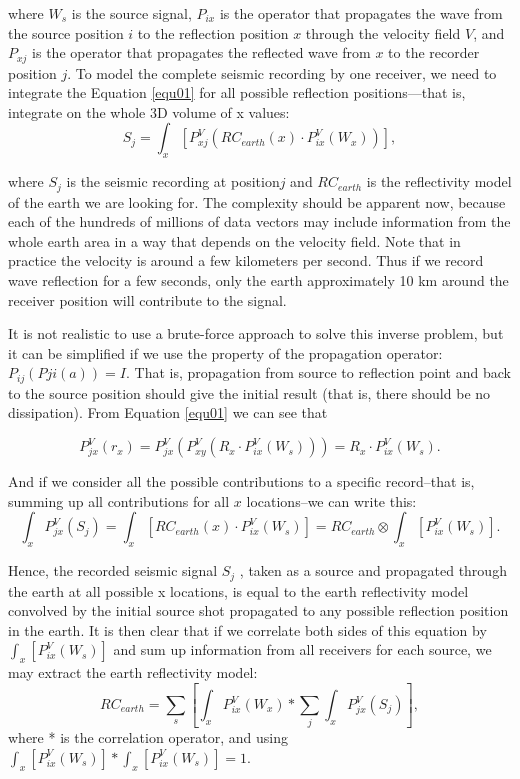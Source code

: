 \documentclass[twocolumn]{article}
\begin{document}
where $W_s$ is the source signal, $P_{ix}$ is the operator that propagates the wave from the source position $i$ to the reflection position $x$ through the velocity field $V$, and $P_{xj}$ is the operator that propagates the reflected wave from $x$ to the recorder position $j$.
To model the complete seismic recording by one receiver, we need to integrate the Equation \ref{equ01} for all possible reflection positions—that is, integrate on the whole 3D volume of x values:
\begin{equation}
S_j = \int_x [P^V_{xj}(RC_{earth}(x) \cdot P^V_{ix}(W_x))],
\label{equ02}
\end{equation}

where $S_j$ is the seismic recording at position$j$ and $RC_{earth}$ is the reflectivity model of the earth we are looking for. The complexity should be apparent now, because each of the hundreds of millions of data vectors may include information from the whole earth area in a way that depends on the velocity field. Note that in practice the velocity is around a few kilometers per second. Thus if we record wave reflection for a few seconds, only the earth approximately 10 km around the receiver position will contribute to the signal.

It is not realistic to use a brute-force approach to solve this inverse problem, but it can be simplified if we use the property of the propagation operator: $P_{ij} (Pji (a)) = I$. That is, propagation from source to reflection point and back to the source position should give the initial result (that is, there should be no dissipation). From Equation \ref{equ01} we can see that

\begin{equation}
P^V_{jx}(r_x) = P^V_{jx}(P^V_{xy}(R_x \cdot P^V_{ix} (W_s))) = R_x \cdot P^V_{ix}(W_s).
\label{equ03}
\end{equation}

And if we consider all the possible contributions to a specific record--that is, summing up all contributions for all $x$ locations--we can write this:
\begin{equation}
\int_x P^V_{jx}(S_j) = \int_x[RC_{earth}(x) \cdot P^V_{ix}(W_s)]  = RC_{earth} \otimes \int_x[P^V_{ix}(W_s)].
\label{equ04}
\end{equation}

Hence, the recorded seismic signal $S_j$ , taken as a source and propagated through the earth at all possible x locations, is equal to the earth reflectivity model convolved by the initial source shot propagated to any possible reflection position in the earth. It is then clear that if we correlate both sides of this equation by $\int_x[P^V_{ix}(W_s)]$ and sum up information from all receivers for each source, we may extract the earth reflectivity model:
$$RC_{earth} = \sum_s[\int_x P^V_{ix}(W_x)*\sum_j \int_x P^V_{jx}(S_j)],$$
where * is the correlation operator, and using $\int_x[P^V_{ix}(W_s)]*\int_x[P^V_{ix}(W_s)]=1$.
\end{document}
